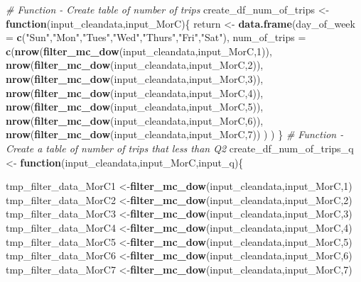 \documentclass[
]{article}
\newenvironment{Shaded}{\begin{snugshade}}{\end{snugshade}}
\newcommand{\AttributeTok}[1]{\textcolor[rgb]{0.13,0.29,0.53}{#1}}
\newcommand{\CommentTok}[1]{\textcolor[rgb]{0.56,0.35,0.01}{\textit{#1}}}
\newcommand{\ControlFlowTok}[1]{\textcolor[rgb]{0.13,0.29,0.53}{\textbf{#1}}}
\newcommand{\DecValTok}[1]{\textcolor[rgb]{0.00,0.00,0.81}{#1}}
\newcommand{\FunctionTok}[1]{\textcolor[rgb]{0.13,0.29,0.53}{\textbf{#1}}}
\newcommand{\NormalTok}[1]{#1}
\newcommand{\OtherTok}[1]{\textcolor[rgb]{0.56,0.35,0.01}{#1}}
\newcommand{\StringTok}[1]{\textcolor[rgb]{0.31,0.60,0.02}{#1}}
\begin{document}
\begin{Shaded}
\begin{Highlighting}[]
\CommentTok{\# Function {-} Create table of number of trips}
\NormalTok{create\_df\_num\_of\_trips }\OtherTok{\textless{}{-}} \ControlFlowTok{function}\NormalTok{(input\_cleandata,input\_MorC)\{}
\NormalTok{  return }\OtherTok{\textless{}{-}} \FunctionTok{data.frame}\NormalTok{(}\AttributeTok{day\_of\_week =} \FunctionTok{c}\NormalTok{(}\StringTok{"Sun"}\NormalTok{,}\StringTok{"Mon"}\NormalTok{,}\StringTok{"Tues"}\NormalTok{,}\StringTok{"Wed"}\NormalTok{,}\StringTok{"Thurs"}\NormalTok{,}\StringTok{"Fri"}\NormalTok{,}\StringTok{"Sat"}\NormalTok{),}
                       \AttributeTok{num\_of\_trips =} \FunctionTok{c}\NormalTok{(}\FunctionTok{nrow}\NormalTok{(}\FunctionTok{filter\_mc\_dow}\NormalTok{(input\_cleandata,input\_MorC,}\DecValTok{1}\NormalTok{)),}
                                        \FunctionTok{nrow}\NormalTok{(}\FunctionTok{filter\_mc\_dow}\NormalTok{(input\_cleandata,input\_MorC,}\DecValTok{2}\NormalTok{)),}
                                        \FunctionTok{nrow}\NormalTok{(}\FunctionTok{filter\_mc\_dow}\NormalTok{(input\_cleandata,input\_MorC,}\DecValTok{3}\NormalTok{)),}
                                        \FunctionTok{nrow}\NormalTok{(}\FunctionTok{filter\_mc\_dow}\NormalTok{(input\_cleandata,input\_MorC,}\DecValTok{4}\NormalTok{)),}
                                        \FunctionTok{nrow}\NormalTok{(}\FunctionTok{filter\_mc\_dow}\NormalTok{(input\_cleandata,input\_MorC,}\DecValTok{5}\NormalTok{)),}
                                        \FunctionTok{nrow}\NormalTok{(}\FunctionTok{filter\_mc\_dow}\NormalTok{(input\_cleandata,input\_MorC,}\DecValTok{6}\NormalTok{)),}
                                        \FunctionTok{nrow}\NormalTok{(}\FunctionTok{filter\_mc\_dow}\NormalTok{(input\_cleandata,input\_MorC,}\DecValTok{7}\NormalTok{))}
\NormalTok{                       )}
\NormalTok{  )}
\NormalTok{\}}
\CommentTok{\# Function {-} Create a table of number of trips that less than Q2}
\NormalTok{create\_df\_num\_of\_trips\_q }\OtherTok{\textless{}{-}} \ControlFlowTok{function}\NormalTok{(input\_cleandata,input\_MorC,input\_q)\{}
  
  
\NormalTok{  tmp\_filter\_data\_MorC1 }\OtherTok{\textless{}{-}}\FunctionTok{filter\_mc\_dow}\NormalTok{(input\_cleandata,input\_MorC,}\DecValTok{1}\NormalTok{)}
\NormalTok{  tmp\_filter\_data\_MorC2 }\OtherTok{\textless{}{-}}\FunctionTok{filter\_mc\_dow}\NormalTok{(input\_cleandata,input\_MorC,}\DecValTok{2}\NormalTok{)}
\NormalTok{  tmp\_filter\_data\_MorC3 }\OtherTok{\textless{}{-}}\FunctionTok{filter\_mc\_dow}\NormalTok{(input\_cleandata,input\_MorC,}\DecValTok{3}\NormalTok{)}
\NormalTok{  tmp\_filter\_data\_MorC4 }\OtherTok{\textless{}{-}}\FunctionTok{filter\_mc\_dow}\NormalTok{(input\_cleandata,input\_MorC,}\DecValTok{4}\NormalTok{)}
\NormalTok{  tmp\_filter\_data\_MorC5 }\OtherTok{\textless{}{-}}\FunctionTok{filter\_mc\_dow}\NormalTok{(input\_cleandata,input\_MorC,}\DecValTok{5}\NormalTok{)}
\NormalTok{  tmp\_filter\_data\_MorC6 }\OtherTok{\textless{}{-}}\FunctionTok{filter\_mc\_dow}\NormalTok{(input\_cleandata,input\_MorC,}\DecValTok{6}\NormalTok{)}
\NormalTok{  tmp\_filter\_data\_MorC7 }\OtherTok{\textless{}{-}}\FunctionTok{filter\_mc\_dow}\NormalTok{(input\_cleandata,input\_MorC,}\DecValTok{7}\NormalTok{)}
  

\end{Highlighting}
\end{Shaded}
\end{document}
